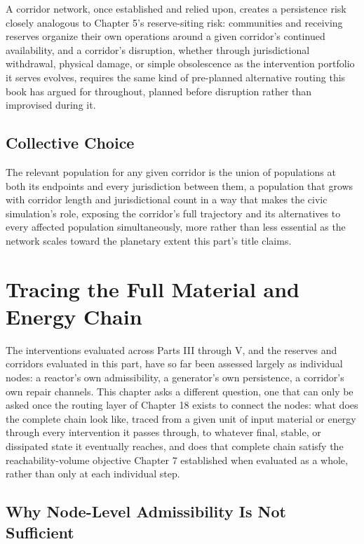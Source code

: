 \documentclass[11pt,oneside]{book}
\begin{document}
A corridor network, once established and relied upon, creates a persistence risk closely analogous to Chapter 5's reserve-siting risk: communities and receiving reserves organize their own operations around a given corridor's continued availability, and a corridor's disruption, whether through jurisdictional withdrawal, physical damage, or simple obsolescence as the intervention portfolio it serves evolves, requires the same kind of pre-planned alternative routing this book has argued for throughout, planned before disruption rather than improvised during it.

\section*{Collective Choice}

The relevant population for any given corridor is the union of populations at both its endpoints and every jurisdiction between them, a population that grows with corridor length and jurisdictional count in a way that makes the civic simulation's role, exposing the corridor's full trajectory and its alternatives to every affected population simultaneously, more rather than less essential as the network scales toward the planetary extent this part's title claims.

\chapter{Tracing the Full Material and Energy Chain}

The interventions evaluated across Parts III through V, and the reserves and corridors evaluated in this part, have so far been assessed largely as individual nodes: a reactor's own admissibility, a generator's own persistence, a corridor's own repair channels. This chapter asks a different question, one that can only be asked once the routing layer of Chapter 18 exists to connect the nodes: what does the complete chain look like, traced from a given unit of input material or energy through every intervention it passes through, to whatever final, stable, or dissipated state it eventually reaches, and does that complete chain satisfy the reachability-volume objective Chapter 7 established when evaluated as a whole, rather than only at each individual step.

\section*{Why Node-Level Admissibility Is Not Sufficient}
\end{document}
